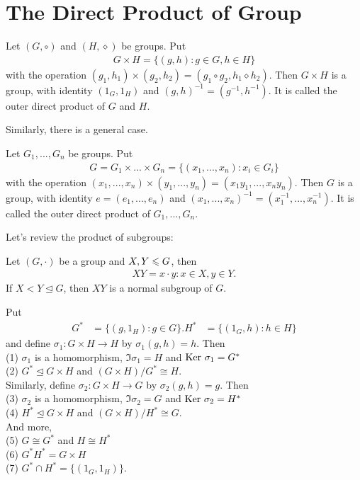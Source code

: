 \chapter{The Direct Product of Group}\label{chp:3_5}

\begin{definition}{}{}
  Let $(G,\circ)$ and $(H,\diamond)$ be groups. Put 
  \begin{align*}
    G\times H=\{(g,h):g\in G,h\in H\}
  \end{align*}
  with the operation  $(g_1,h_1)\times (g_2,h_2)=(g_1\circ g_2, h_1\diamond h_2)$. 
  Then $G\times H$ is a group, with identity $(1_G,1_H)$ and $(g,h)^{-1}=(g^{-1},h^{-1})$.
  It is called the outer direct product of $G$ and $H$.
\end{definition}
Similarly, there is a general case.
\begin{definition}{}{}
    Let $G_1,...,G_n$ be groups. Put 
    \begin{align*}
      G = G_1\times ...\times G_n=\{(x_1,...,x_n):x_i\in G_i\}
    \end{align*}
    with the operation  $(x_1,...,x_n)\times (y_1,...,y_n)=(x_1y_1,..., x_ny_n)$. 
    Then $G$ is a group, with identity $e = (e_1,...,e_n)$ and $(x_1,...,x_n)^{-1}=(x_1^{-1},...,x_n^{-1})$.
    It is called the outer direct product of $G_1,...,G_n$.
\end{definition}

Let's review the product of subgroups: 
\begin{proposition}{}{}
    Let $(G,\cdot)$ be a group and $X,Y\leqslant G$, then
\begin{align*}
    XY = {x\cdot y:x\in X,y\in Y}.
\end{align*}
If $X<Y\unlhd G$, then $XY$ is a normal subgroup of $G$.
\end{proposition}




\begin{theorem}{}{}
    Put
    \begin{align*}
        G^* &= \{(g,1_H):g\in G\}.
        H^* &= \{(1_G,h):h\in H\}
    \end{align*}
    and define $\sigma_1 : G\times H\rightarrow H$ by $\sigma_1(g,h)=h$. Then\\
    (1) $\sigma_1$ is a homomorphism, $\Im \sigma_1 = H$ and $\text{Ker }\sigma_1 = G^*$\\
    (2) $G^*\unlhd G\times H$ and $(G\times H)/G^*\cong H$.\\
    Similarly, define $\sigma_2 : G\times H\rightarrow G$ by $\sigma_2(g,h)=g$. Then\\
    (3) $\sigma_2$ is a homomorphism, $\Im \sigma_2 = G$ and $\text{Ker }\sigma_2 = H^*$\\
    (4) $H^*\unlhd G\times H$ and $(G\times H)/H^*\cong G$.\\
    And more, \\
    (5) $G\cong G^*$ and $H\cong H^*$\\
    (6) $G^*H^*=G\times H$\\
    (7) $G^*\cap H^*=\{(1_G,1_H)\}$.
\end{theorem}

